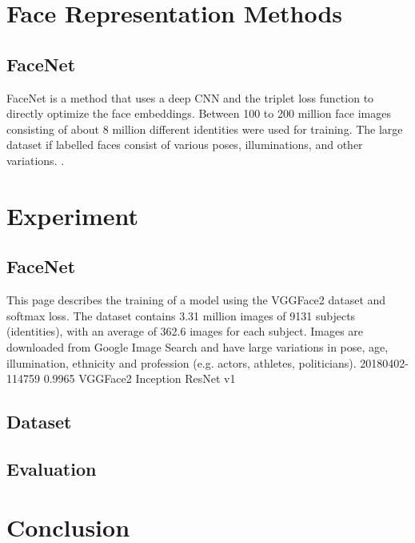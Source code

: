 \documentclass[12pt,english]{article}
\begin{document}
\section{Face Representation Methods}

\subsection{FaceNet}

\quad

FaceNet is a method that uses a deep CNN and the triplet loss function to directly optimize the face embeddings. Between 100 to 200 million face images consisting of about 8 million different identities were used for training. The large dataset if labelled faces consist of various poses, illuminations, and other variations. \cite{schroff}.

\section{Experiment}

\subsection{FaceNet}

This page describes the training of a model using the VGGFace2 dataset and softmax loss. The dataset contains 3.31 million images of 9131 subjects (identities), with an average of 362.6 images for each subject. Images are downloaded from Google Image Search and have large variations in pose, age, illumination, ethnicity and profession (e.g. actors, athletes, politicians).
20180402-114759
0.9965
VGGFace2
Inception ResNet v1

\subsection{Dataset}


\subsection{Evaluation}


\section{Conclusion}

\nocite{*}

\printbibliography
\end{document}
